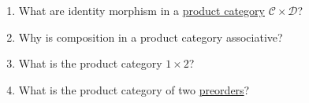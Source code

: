 \begin{enumerate}
    \item What are identity morphism in a \hyperref[X3.89]{product category} $\mathcal{C}\times \mathcal{D}$?
    \item Why is composition in a product category associative?
    \item What is the product category $1 \times 2$?
    \item What is the product category of two \hyperref[D1.30]{preorders}?
  \end{enumerate}